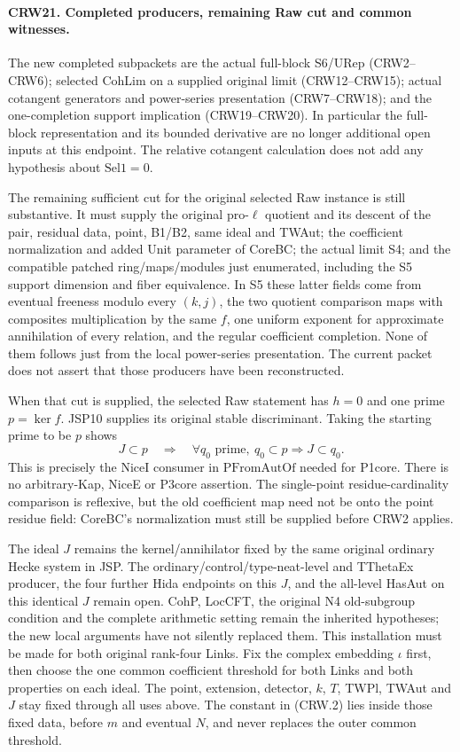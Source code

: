 \paragraph{CRW21. Completed producers, remaining Raw cut and common witnesses.}
\label{claim:CRW21}
The new completed subpackets are the actual full-block
S6/URep (CRW2--CRW6); selected CohLim on a supplied original
limit (CRW12--CRW15); actual cotangent generators and
power-series presentation (CRW7--CRW18); and the
one-completion support implication (CRW19--CRW20).
In particular the full-block representation and its
bounded derivative are no longer additional open inputs
at this endpoint.  The relative cotangent calculation
does not add any hypothesis about $\mathrm{Sel1}=0$.

The remaining sufficient cut for the original selected
Raw instance is still substantive.  It must supply
the original pro-$\ell$ quotient and its descent of
the pair, residual data, point, B1/B2, same ideal and
TWAut; the coefficient normalization and added Unit
parameter of CoreBC; the actual limit S4; and the
compatible patched ring/maps/modules just enumerated,
including the S5 support dimension and fiber equivalence.
In S5 these latter fields come from eventual freeness
modulo every $(k,j)$, the two quotient comparison maps
with composites multiplication by the same $f$, one
uniform exponent for approximate annihilation of every
relation, and the regular coefficient completion.
None of them follows just from the local power-series
presentation.  The current packet does not assert
that those producers have been reconstructed.

When that cut is supplied, the selected Raw statement
has $h=0$ and one prime $p=\ker f$.
JSP10 supplies its original stable discriminant.
Taking the starting prime to be $p$ shows
\[
 J\subset p\quad\Longrightarrow\quad
   \forall q_0\text{ prime},\ q_0\subset p
             \Longrightarrow J\subset q_0.        \tag{CRW.32}
\]
This is precisely the NiceI consumer in
$\mathrm{PFromAutOf}$ needed for P1core.
There is no arbitrary-Kap, NiceE or P3core assertion.
The single-point residue-cardinality comparison is
reflexive, but the old coefficient map need not be
onto the point residue field: CoreBC's normalization
must still be supplied before CRW2 applies.

The ideal $J$ remains the kernel/annihilator fixed by
the same original ordinary Hecke system in JSP.
The ordinary/control/type-neat-level and TThetaEx
producer, the four further Hida endpoints on this $J$,
and the all-level HasAut on this identical $J$ remain
open.  CohP, LocCFT, the original N4 old-subgroup
condition and the complete arithmetic setting remain
the inherited hypotheses; the new local arguments
have not silently replaced them.
This installation must be made for both original
rank-four Links.  Fix the complex embedding $\iota$
first, then choose the one common coefficient threshold
for both Links and both properties on each ideal.
The point, extension, detector, $k$, $T$, TWPl, TWAut
and $J$ stay fixed through all uses above.
The constant in (CRW.2) lies inside those fixed data,
before $m$ and eventual $N$, and never replaces the
outer common threshold.

